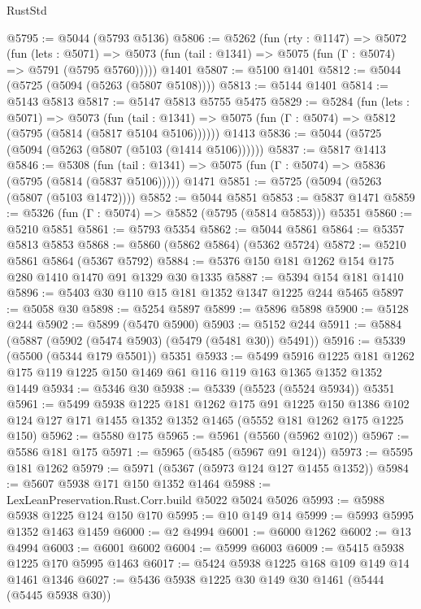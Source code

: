 \begin{lexlean}{RustStd}
\begin{coremodule}
@5795 := @5044 (@5793 @5136)
@5806 := @5262
    (fun (rty : @1147) =>
    @5072
      (fun (lets : @5071) =>
      @5073 (fun (tail : @1341) => @5075 (fun (Γ : @5074) => @5791 (@5795 @5760)))))
    @1401
@5807 := @5100 @1401
@5812 := @5044 (@5725 (@5094 (@5263 (@5807 @5108))))
@5813 := @5144 @1401
@5814 := @5143 @5813
@5817 := @5147 @5813 @5755 @5475
@5829 := @5284
    (fun (lets : @5071) =>
    @5073
      (fun (tail : @1341) => @5075 (fun (Γ : @5074) => @5812 (@5795 (@5814 (@5817 @5104 @5106))))))
    @1413
@5836 := @5044 (@5725 (@5094 (@5263 (@5807 (@5103 (@1414 @5106))))))
@5837 := @5817 @1413
@5846 := @5308
    (fun (tail : @1341) => @5075 (fun (Γ : @5074) => @5836 (@5795 (@5814 (@5837 @5106)))))
    @1471
@5851 := @5725 (@5094 (@5263 (@5807 (@5103 @1472))))
@5852 := @5044 @5851
@5853 := @5837 @1471
@5859 := @5326 (fun (Γ : @5074) => @5852 (@5795 (@5814 @5853))) @5351
@5860 := @5210 @5851
@5861 := @5793 @5354
@5862 := @5044 @5861
@5864 := @5357 @5813 @5853
@5868 := @5860 (@5862 @5864) (@5362 @5724)
@5872 := @5210 @5861 @5864 (@5367 @5792)
@5884 := @5376 @150 @181 @1262 @154 @175 @280 @1410 @1470 @91 @1329 @30 @1335
@5887 := @5394 @154 @181 @1410
@5896 := @5403 @30 @110 @15 @181 @1352 @1347 @1225 @244 @5465
@5897 := @5058 @30
@5898 := @5254 @5897
@5899 := @5896 @5898
@5900 := @5128 @244
@5902 := @5899 (@5470 @5900)
@5903 := @5152 @244
@5911 := @5884 (@5887 (@5902 (@5474 @5903) (@5479 (@5481 @30)) @5491))
@5916 := @5339 (@5500 (@5344 @179 @5501)) @5351
@5933 := @5499
    @5916
    @1225
    @181
    @1262
    @175
    @119
    @1225
    @150
    @1469
    @61
    @116
    @119
    @163
    @1365
    @1352
    @1352
    @1449
@5934 := @5346 @30
@5938 := @5339 (@5523 (@5524 @5934)) @5351
@5961 := @5499
    @5938
    @1225
    @181
    @1262
    @175
    @91
    @1225
    @150
    @1386
    @102
    @124
    @127
    @171
    @1455
    @1352
    @1352
    @1465
    (@5552 @181 @1262 @175 @1225 @150)
@5962 := @5580 @175
@5965 := @5961 (@5560 (@5962 @102))
@5967 := @5586 @181 @175
@5971 := @5965 (@5485 (@5967 @91 @124))
@5973 := @5595 @181 @1262
@5979 := @5971 (@5367 (@5973 @124 @127 @1455 @1352))
@5984 := @5607 @5938 @171 @150 @1352 @1464
@5988 := LexLeanPreservation.Rust.Corr.build @5022 @5024 @5026
@5993 := @5988 @5938 @1225 @124 @150 @170
@5995 := @10 @149 @14
@5999 := @5993 @5995 @1352 @1463 @1459
@6000 := @2 @4994
@6001 := @6000 @1262
@6002 := @13 @4994
@6003 := @6001 @6002
@6004 := @5999 @6003
@6009 := @5415 @5938 @1225 @170 @5995 @1463
@6017 := @5424 @5938 @1225 @168 @109 @149 @14 @1461 @1346
@6027 := @5436 @5938 @1225 @30 @149 @30 @1461 (@5444 (@5445 @5938 @30))

\end{coremodule}
\end{lexlean}
